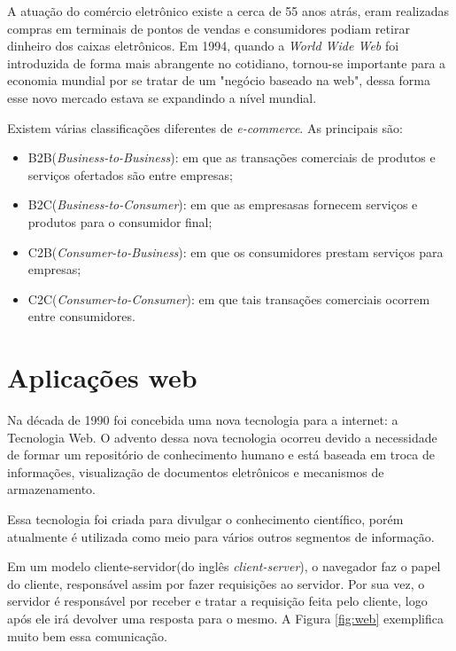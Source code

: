 A atuação do comércio eletrônico existe a cerca de 55 anos atrás, eram realizadas compras em terminais de pontos de vendas e consumidores podiam retirar dinheiro dos caixas eletrônicos\cite{wigand1997electronic}. Em 1994, quando a \textit{World Wide Web} foi introduzida de forma mais abrangente no cotidiano, tornou-se importante para a economia mundial por se tratar de um "negócio baseado na web", dessa forma esse novo mercado estava se expandindo a nível mundial\cite{nanehkaran2013introduction}.

Existem várias classificações diferentes de \textit{e-commerce}. As principais são:
\begin{itemize}  
\item B2B(\textit{Business-to-Business}): em que as transações comerciais de produtos e serviços ofertados são entre empresas;
\item B2C(\textit{Business-to-Consumer}): em que as empresasas fornecem serviços e produtos para o consumidor final;
\item C2B(\textit{Consumer-to-Business}): em que os consumidores prestam serviços para empresas;
\item C2C(\textit{Consumer-to-Consumer}): em que tais transações comerciais ocorrem entre consumidores.
\end{itemize}

\section{Aplicações web}
\label{sec:trabalhos_correlatos}

Na década de 1990 foi concebida uma nova tecnologia para a internet: a Tecnologia Web\cite{zaneti2005construcao}. O advento dessa nova tecnologia ocorreu devido a necessidade de formar um repositório de conhecimento humano \cite{lee1994www} e está baseada em troca de informações, visualização de documentos eletrônicos e mecanismos de armazenamento. \par
Essa tecnologia foi criada para divulgar o conhecimento científico, porém atualmente é utilizada como meio para vários outros segmentos de informação\cite{zaneti2005construcao}. \par
Em um modelo cliente-servidor(do inglês \textit{client-server}), o navegador faz o papel do cliente, responsável assim por fazer requisições ao servidor. Por sua vez, o servidor é responsável por receber e tratar a requisição feita pelo cliente, logo após ele irá devolver uma resposta para o mesmo\cite{sousa2016desenvolvimento}. A Figura \ref{fig:web} exemplifica muito bem essa comunicação.

